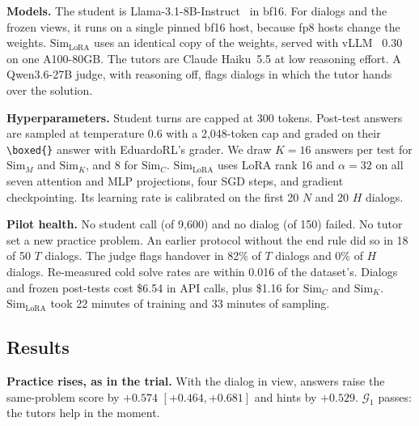 \documentclass{article} %
\newcommand{\simM}{\ensuremath{\text{Sim}_M}}
\newcommand{\simC}{\ensuremath{\text{Sim}_C}}
\newcommand{\simK}{\ensuremath{\text{Sim}_K}}
\newcommand{\simL}{\ensuremath{\text{Sim}_{\text{LoRA}}}}
\newcommand{\gate}[1]{\ensuremath{\mathcal{G}_{#1}}}
\begin{document}
\textbf{Models.} The student is Llama-3.1-8B-Instruct~\citep{grattafiori2024llama} in bf16. For dialogs and the frozen views, it runs on a single pinned bf16 host, because fp8 hosts change the weights. \simL{} uses an identical copy of the weights, served with vLLM~\citep{kwon2023vllm} 0.30 on one A100-80GB. The tutors are Claude Haiku~5.5 at low reasoning effort. A Qwen3.6-27B judge, with reasoning off, flags dialogs in which the tutor hands over the solution.

\textbf{Hyperparameters.} Student turns are capped at 300 tokens. Post-test answers are sampled at temperature 0.6 with a 2{,}048-token cap and graded on their \verb|\boxed{}| answer with EduardoRL's grader. We draw $K=16$ answers per test for \simM{} and \simK{}, and 8 for \simC. \simL{} uses LoRA rank 16 and $\alpha=32$ on all seven attention and MLP projections, four SGD steps, and gradient checkpointing. Its learning rate is calibrated on the first 20 $N$ and 20 $H$ dialogs.

\textbf{Pilot health.} No student call (of 9{,}600) and no dialog (of 150) failed. No tutor set a new practice problem. An earlier protocol without the end rule did so in 18 of 50 $T$ dialogs. The judge flags handover in 82\% of $T$ dialogs and 0\% of $H$ dialogs. Re-measured cold solve rates are within 0.016 of the dataset's. Dialogs and frozen post-tests cost \$6.54 in API calls, plus \$1.16 for \simC{} and \simK. \simL{} took 22 minutes of training and 33 minutes of sampling.

\subsection{Results}
\textbf{Practice rises, as in the trial.} With the dialog in view, answers raise the same-problem score by $+0.574$ $[+0.464,+0.681]$ and hints by $+0.529$. \gate{1} passes: the tutors help in the moment.
\end{document}
